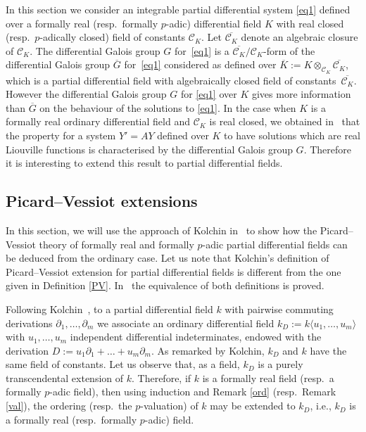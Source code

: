 \documentclass[pdftex]{sigma}%
\numberwithin{equation}{section}
\begin{document}
In this section we consider an integrable partial differential system \eqref{eq1} defined over a formally real (resp.\ formally $p$-adic) differential field $K$ with real closed (resp.\ $p$-adically closed) field of constants $\mathcal{C}_K$. Let $\overline{\mathcal{C}_K}$ denote an algebraic closure of $\mathcal{C}_K$. The differential Galois group $G$ for~\eqref{eq1} is a $\overline{\mathcal{C}_K}/\mathcal{C}_K$-form of the differential Galois group $\overline{G}$ for~\eqref{eq1} considered as defined over $\overline{K}:=K\otimes_{\mathcal{C}_K} \overline{\mathcal{C}_K}$, which is a partial differential field with algebraically closed field of constants~$\overline{\mathcal{C}_K}$. However the differential Galois group $G$ for \eqref{eq1} over $K$ gives more information than $\overline{G}$ on the behaviour of the solutions to \eqref{eq1}.
In the case when $K$ is a formally real ordinary differential field and $\mathcal{C}_K$ is real closed, we obtained in~\cite{CH} that the property for a system $Y'=AY$ defined over $K$ to have solutions which are real
Liouville functions is characterised by the differential Galois group $G$. Therefore it is interesting to extend this result to partial differential fields.


\subsection{Picard--Vessiot extensions}

In this section, we will use the approach of Kolchin in~\cite{Kol1} to show how the Picard--Vessiot theory of formally real and formally $p$-adic partial differential fields can be deduced from the ordinary case. Let us note that Kolchin's definition of Picard--Vessiot extension for partial differential fields is different from the one given in Definition \ref{PV}. In~\cite[Theorem 1]{CHJac} the equivalence of both definitions is proved.

\begin{Remark}\label{D} Following Kolchin~\cite{Kol1}, to a partial differential field $k$ with pairwise commu\-ting derivations
$\partial_1, \dots ,\partial_m$ we associate an ordinary differential field $k_D:=k\langle u_1,\dots,u_m \rangle$
with $u_1,\dots,u_m$ independent differential indeterminates, endowed with the derivation $D:=u_1\partial_1+\dots + u_m\partial_m$.
As remarked by Kolchin, $k_D$ and $k$ have the same field of constants.
Let us observe that, as a field, $k_D$ is a purely transcendental extension of $k$. Therefore, if $k$ is a formally real field (resp.\ a formally $p$-adic field), then using induction and Remark \ref{ord} (resp.\ Remark \ref{val}), the ordering (resp.\ the $p$-valuation) of $k$ may be extended to $k_D$, i.e., $k_D$ is a formally real (resp.\ formally $p$-adic) field.
\end{Remark}
\end{document}
